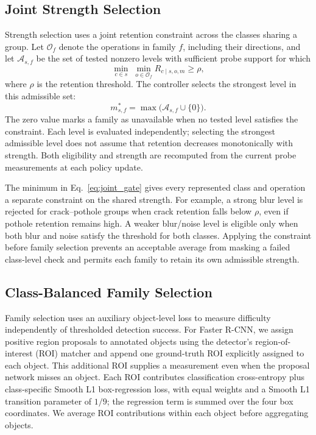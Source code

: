\documentclass[conference]{IEEEtran}
\begin{document}
\subsection{Joint Strength Selection}
\label{sec:method_strength}
Strength selection uses a joint retention constraint across the classes sharing a group. Let $\mathcal{O}_f$ denote the operations in family $f$, including their directions, and let $\mathcal{A}_{s,f}$ be the set of tested nonzero levels with sufficient probe support for which
\begin{equation}
 \min_{c\in s}\;\min_{o\in\mathcal{O}_f}
 R_{c\mid s,o,m}\geq\rho,
 \label{eq:joint_gate}
\end{equation}
where $\rho$ is the retention threshold. The controller selects the strongest level in this admissible set:
\begin{equation}
 m^*_{s,f}=\max\bigl(\mathcal{A}_{s,f}\cup\{0\}\bigr).
 \label{eq:selected_strength}
\end{equation}
The zero value marks a family as unavailable when no tested level satisfies the constraint. Each level is evaluated independently; selecting the strongest admissible level does not assume that retention decreases monotonically with strength. Both eligibility and strength are recomputed from the current probe measurements at each policy update.

The minimum in Eq.~\ref{eq:joint_gate} gives every represented class and operation a separate constraint on the shared strength. For example, a strong blur level is rejected for crack--pothole groups when crack retention falls below $\rho$, even if pothole retention remains high. A weaker blur/noise level is eligible only when both blur and noise satisfy the threshold for both classes. Applying the constraint before family selection prevents an acceptable average from masking a failed class-level check and permits each family to retain its own admissible strength.

\subsection{Class-Balanced Family Selection}
\label{sec:method_allocation}
Family selection uses an auxiliary object-level loss to measure difficulty independently of thresholded detection success. For Faster R-CNN, we assign positive region proposals to annotated objects using the detector's region-of-interest (ROI) matcher and append one ground-truth ROI explicitly assigned to each object. This additional ROI supplies a measurement even when the proposal network misses an object. Each ROI contributes classification cross-entropy plus class-specific Smooth L1 box-regression loss, with equal weights and a Smooth L1 transition parameter of $1/9$; the regression term is summed over the four box coordinates. We average ROI contributions within each object before aggregating objects.
\end{document}
